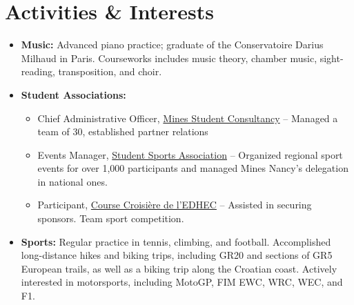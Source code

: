 \documentclass[a4paper,9pt]{extarticle}
\begin{document}
\vspace{7pt}

\section*{Activities \& Interests}
\begin{itemize}
\item \textbf{Music:} Advanced piano practice; graduate of the Conservatoire Darius Milhaud in Paris. Courseworks includes music theory, chamber music, sight-reading, transposition, and choir.
\item \textbf{Student Associations:}
\begin{itemize}
\item Chief Administrative Officer, \href{https://mines-services.fr/}{Mines Student Consultancy} -- Managed a team of 30, established partner relations
\item Events Manager, \href{https://www.bdeminesnancy.com/bds}{Student Sports Association} -- Organized regional sport events for over 1,000 participants and managed Mines Nancy's delegation in national ones.
\item Participant, \href{https://cce.fr/}{Course Croisière de l’EDHEC} -- Assisted in securing sponsors. Team sport competition.
\end{itemize}
\item \textbf{Sports:} Regular practice in tennis, climbing, and football. Accomplished long-distance hikes and biking trips, including GR20 and sections of GR5 European trails, as well as a biking trip along the Croatian coast. Actively interested in motorsports, including MotoGP, FIM EWC, WRC, WEC, and F1.
\end{itemize}
\end{document}
